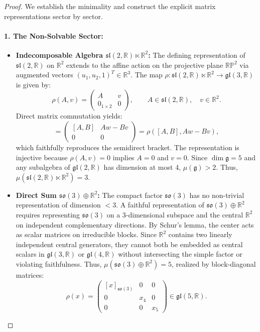 \documentclass[11pt,a4paper]{article}
\theoremstyle{definition}
\theoremstyle{remark}
\newcommand{\R}{\mathbb{R}}
\newcommand{\g}{\mathfrak{g}}
\begin{document}
\begin{proof}
We establish the minimality and construct the explicit matrix representations sector by sector.

\paragraph{1. The Non-Solvable Sector:}
\begin{itemize}
    \item \textbf{Indecomposable Algebra $\mathfrak{sl}(2,\R) \ltimes \R^2$:} The defining representation of $\mathfrak{sl}(2,\R)$ on $\R^2$ extends to the affine action on the projective plane $\R\mathbb{P}^2$ via augmented vectors $(u_1, u_2, 1)^T \in \R^3$. The map $\rho \colon \mathfrak{sl}(2,\R) \ltimes \R^2 \to \mathfrak{gl}(3,\R)$ is given by:
    \begin{equation}
        \rho(A, v) = \begin{pmatrix} A & v \\ 0_{1 \times 2} & 0 \end{pmatrix}, \qquad A \in \mathfrak{sl}(2,\R), \quad v \in \R^2.
    \end{equation}
    Direct matrix commutation yields:
    \begin{equation}
        [\rho(A, v), \rho(B, w)] = \begin{pmatrix} [A, B] & A w - B v \\ 0 & 0 \end{pmatrix} = \rho([A, B], A w - B v),
    \end{equation}
    which faithfully reproduces the semidirect bracket. The representation is injective because $\rho(A, v) = 0$ implies $A = 0$ and $v = 0$. Since $\dim \g = 5$ and any subalgebra of $\mathfrak{gl}(2, \R)$ has dimension at most 4, $\mu(\g) > 2$. Thus, $\mu(\mathfrak{sl}(2,\R) \ltimes \R^2) = 3$.
    
    \item \textbf{Direct Sum $\mathfrak{so}(3) \oplus \R^2$:} The compact factor $\mathfrak{so}(3)$ has no non-trivial representation of dimension $< 3$. A faithful representation of $\mathfrak{so}(3) \oplus \R^2$ requires representing $\mathfrak{so}(3)$ on a 3-dimensional subspace and the central $\R^2$ on independent complementary directions. By Schur's lemma, the center acts as scalar matrices on irreducible blocks. Since $\R^2$ contains two linearly independent central generators, they cannot both be embedded as central scalars in $\mathfrak{gl}(3, \R)$ or $\mathfrak{gl}(4, \R)$ without intersecting the simple factor or violating faithfulness. Thus, $\mu(\mathfrak{so}(3) \oplus \R^2) = 5$, realized by block-diagonal matrices:
    \begin{equation}
        \rho(x) = \begin{pmatrix} [x]_{\mathfrak{so}(3)} & 0 & 0 \\ 0 & x_4 & 0 \\ 0 & 0 & x_5 \end{pmatrix} \in \mathfrak{gl}(5, \R).
    \end{equation}
\end{itemize}


\end{proof}
\end{document}
